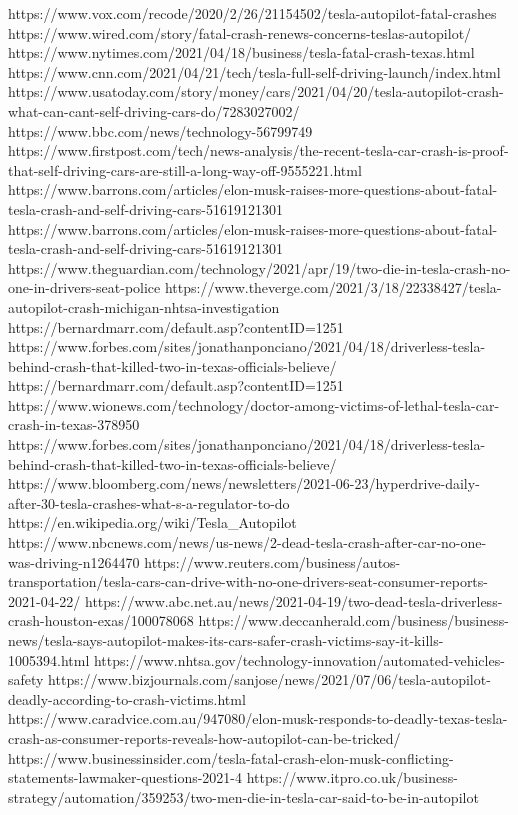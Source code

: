 https://www.vox.com/recode/2020/2/26/21154502/tesla-autopilot-fatal-crashes
https://www.wired.com/story/fatal-crash-renews-concerns-teslas-autopilot/
https://www.nytimes.com/2021/04/18/business/tesla-fatal-crash-texas.html
https://www.cnn.com/2021/04/21/tech/tesla-full-self-driving-launch/index.html
https://www.usatoday.com/story/money/cars/2021/04/20/tesla-autopilot-crash-what-can-cant-self-driving-cars-do/7283027002/
https://www.bbc.com/news/technology-56799749
https://www.firstpost.com/tech/news-analysis/the-recent-tesla-car-crash-is-proof-that-self-driving-cars-are-still-a-long-way-off-9555221.html
https://www.barrons.com/articles/elon-musk-raises-more-questions-about-fatal-tesla-crash-and-self-driving-cars-51619121301
https://www.barrons.com/articles/elon-musk-raises-more-questions-about-fatal-tesla-crash-and-self-driving-cars-51619121301
https://www.theguardian.com/technology/2021/apr/19/two-die-in-tesla-crash-no-one-in-drivers-seat-police
https://www.theverge.com/2021/3/18/22338427/tesla-autopilot-crash-michigan-nhtsa-investigation
https://bernardmarr.com/default.asp?contentID=1251
https://www.forbes.com/sites/jonathanponciano/2021/04/18/driverless-tesla-behind-crash-that-killed-two-in-texas-officials-believe/
https://bernardmarr.com/default.asp?contentID=1251
https://www.wionews.com/technology/doctor-among-victims-of-lethal-tesla-car-crash-in-texas-378950
https://www.forbes.com/sites/jonathanponciano/2021/04/18/driverless-tesla-behind-crash-that-killed-two-in-texas-officials-believe/
https://www.bloomberg.com/news/newsletters/2021-06-23/hyperdrive-daily-after-30-tesla-crashes-what-s-a-regulator-to-do
https://en.wikipedia.org/wiki/Tesla_Autopilot
https://www.nbcnews.com/news/us-news/2-dead-tesla-crash-after-car-no-one-was-driving-n1264470
https://www.reuters.com/business/autos-transportation/tesla-cars-can-drive-with-no-one-drivers-seat-consumer-reports-2021-04-22/
https://www.abc.net.au/news/2021-04-19/two-dead-tesla-driverless-crash-houston-exas/100078068
https://www.deccanherald.com/business/business-news/tesla-says-autopilot-makes-its-cars-safer-crash-victims-say-it-kills-1005394.html
https://www.nhtsa.gov/technology-innovation/automated-vehicles-safety
https://www.bizjournals.com/sanjose/news/2021/07/06/tesla-autopilot-deadly-according-to-crash-victims.html
https://www.caradvice.com.au/947080/elon-musk-responds-to-deadly-texas-tesla-crash-as-consumer-reports-reveals-how-autopilot-can-be-tricked/
https://www.businessinsider.com/tesla-fatal-crash-elon-musk-conflicting-statements-lawmaker-questions-2021-4
https://www.itpro.co.uk/business-strategy/automation/359253/two-men-die-in-tesla-car-said-to-be-in-autopilot
